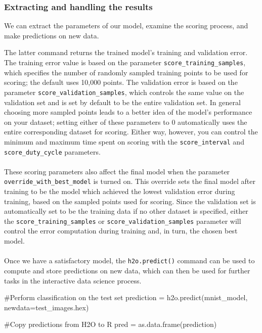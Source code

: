 \documentclass[11pt]{article}
\begin{document}
\subsubsection{Extracting and handling the results} \label{3.2.1}

We can extract the parameters of our model, examine the scoring process, and make predictions on new data.

\noindent
The latter command returns the trained model's training and validation error. The training error value is based on the parameter \texttt{score\_training\_samples}, which specifies the number of randomly sampled training points to be used for scoring; the default uses 10,000 points. The validation error is based on the parameter \texttt{score\_validation\_samples}, which controls the same value on the validation set and is set by default to be the entire validation set.
In general choosing more sampled points leads to a better idea of the model's performance on your dataset; setting either of these parameters to 0 automatically uses the entire corresponding dataset for scoring. Either way, however, you can control the minimum
and maximum time spent on scoring with the \texttt{score\_interval} and \texttt{score\_duty\_cycle} parameters.
\\
\\
These scoring parameters also affect the final model when the parameter \texttt{override\_with\_best\_model} is turned on. This override sets the final model after training to be the model which achieved the lowest validation error during training, based on
the sampled points used for scoring. Since the validation set is automatically set to be the training data if no other dataset is specified, either the \texttt{score\_training\_samples} or \texttt{score\_validation\_samples} parameter will control the error computation
during training and, in turn, the chosen best model.
\\
\\
Once we have a satisfactory model, the \texttt{h2o.predict()} command can be used to compute and store predictions on new data, which can then be used for further tasks in the interactive data science process.
\begin{spverbatim}
#Perform classification on the test set
prediction = h2o.predict(mnist_model, newdata=test_images.hex)

#Copy predictions from H2O to R
pred = as.data.frame(prediction)

\end{spverbatim}
\end{document}
